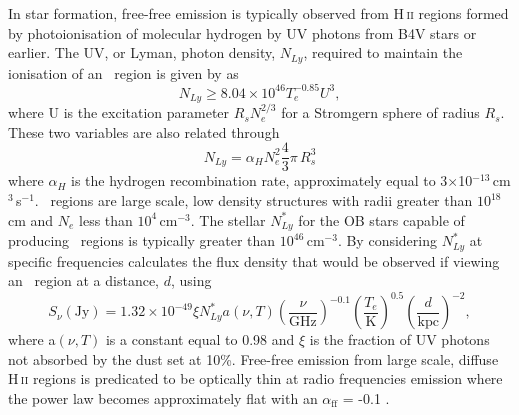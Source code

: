 In star formation, free-free emission is typically observed from H\,\textsc{ii} regions formed by photoionisation of molecular hydrogen by UV photons from B4V stars or earlier. The UV, or Lyman, photon density, $N_{Ly}$,  required to maintain the ionisation of an \HII\ region is given by \cite{Kurtz:1994cr} as 
\begin{equation}
N_{Ly} \geq 8.04\times10^{46}T_{e}^{-0.85}U^{3}, 
\label{eqn:lyman}
\end{equation}
where U is the excitation parameter $R_{s}N_{e}^{2/3}$ for a Stromgern sphere of radius $R_{s}$. These two variables are also related through 
\begin{equation}
N_{Ly} = \alpha _HN_e^{2}\frac{4}{3}\pi\,R_s^3
\label{eqn:stromgern}
\end{equation}
where $\alpha _H$ is the hydrogen recombination rate, approximately equal to 3$\times$10$^{-13}$\,cm$^{3}$\,s$^{-1}$. \HII\ regions are large scale, low density structures with radii greater than $10^{18}$\,cm and $N_{e}$ less than $10^{4}$\,cm$^{-3}$. The stellar $N^{*}_{Ly}$ for the OB stars capable of producing \HII\ regions is typically greater than $10^{46}$\,cm$^{-3}$. By considering $N^{*}_{Ly}$ at specific frequencies \cite{Kurtz:1994cr} calculates the flux density that would be observed if viewing an \HII\ region at a distance, $d$, using 
\begin{equation}
S_{\nu}(\mathrm{Jy}) = 1.32\times10^{-49}\xi N^{*}_{Ly}a(\nu,T)\left ( \frac{\nu}{\mathrm{GHz}} \right )^{-0.1}\left ( \frac{T_{e}}{\mathrm{K}} \right )^{0.5}\left ( \frac{d}{\mathrm{kpc}} \right )^{-2},
\label{eqn:kurtz}
\end{equation}
where a$(\nu,T)$ is a constant equal to 0.98 \citep{Mezger:1967fk} and $\xi$ is the fraction of UV photons not absorbed by the dust set at 10\%. Free-free emission from large scale, diffuse H\,\textsc{ii} regions is predicated to be optically thin at radio frequencies emission where the power law becomes approximately flat with an $\alpha_{\mathrm{ff}}$ = -0.1 \citep{Oster:1961fk, Mezger:1967fk}. 

